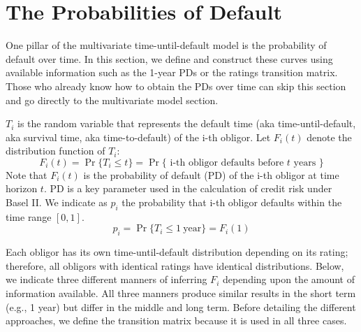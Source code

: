 \documentclass[11pt,fleqn]{book} %
\begin{document}
\section{The Probabilities of Default}
\label{sec:pd}

One pillar of the multivariate time-until-default model is the probability 
of default over time. In this section, we define and construct these curves 
using available information such as the 1-year PDs or the ratings 
transition matrix. Those who already know how to obtain the PDs over time 
can skip this section and go directly to the multivariate model section.

\begin{definition}
	$T_i$ is the random variable that represents the default time 
	(aka time-until-default, aka survival time, aka time-to-default) of the 
	i-th obligor. Let $F_i(t)$ denote the distribution function of $T_i$:
	\begin{displaymath}
		F_i(t) = \Pr\{T_i \le t\} = 
		\Pr\{\text{ i-th obligor defaults before $t$ years }\}
	\end{displaymath}
	Note that $F_i(t)$ is the probability of default (PD) of the i-th obligor
	at time horizon $t$. PD is a key parameter used in the calculation of credit 
	risk under Basel II\@. We indicate as $p_i$ the probability that i-th obligor 
	defaults within the time range $[0,1]$.
	\begin{displaymath}
		p_i = \Pr\{T_i \le 1\ \text{year}\} = F_i(1) 
	\end{displaymath}
\end{definition}

Each obligor has its own time-until-default distribution depending on its 
rating; therefore, all obligors with identical ratings have identical
distributions. Below, we indicate three different manners of inferring $F_i$ 
depending upon the amount of information available. All three manners produce 
similar results in the short term (e.g., 1 year) but differ in the middle and
long term. Before detailing the different approaches, we define the transition 
matrix because it is used in all three cases.
\end{document}
